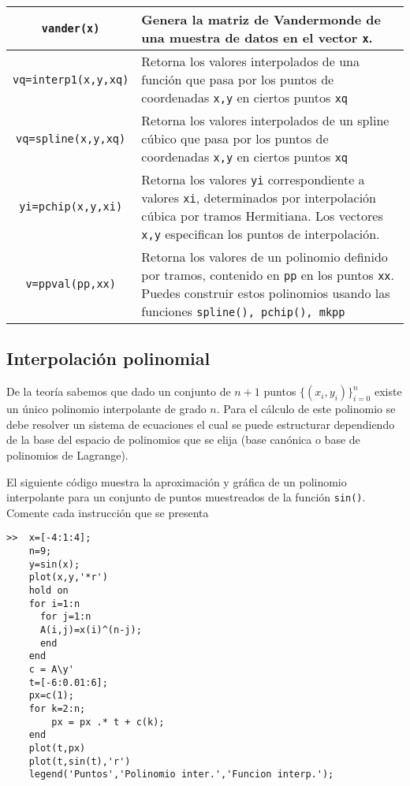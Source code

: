 \documentclass[12pt,letterpaper]{article}
\begin{document}
\begin{longtable}{||c|p{}||}
\hline
\texttt{vander(x)} 			& Genera la matriz de Vandermonde de una muestra de datos en el vector \texttt{x}. \\
\hline
\texttt{vq=interp1(x,y,xq)}	& Retorna los valores interpolados de una funci\'on que pasa por los puntos de coordenadas \texttt{x,y} en ciertos puntos \texttt{xq} \\
\hline
\texttt{vq=spline(x,y,xq)}	& Retorna los valores interpolados de un spline c\'ubico que pasa por los puntos de coordenadas \texttt{x,y} en ciertos puntos \texttt{xq} \\
\hline 
\texttt{yi=pchip(x,y,xi)}	& Retorna los valores \texttt{yi} correspondiente a valores \texttt{xi}, determinados por interpolaci\'on c\'ubica por tramos Hermitiana. Los vectores \texttt{x,y} especifican los puntos de interpolaci\'on. \\
\hline
\texttt{v=ppval(pp,xx)}		& Retorna los valores de un polinomio definido por tramos, contenido en \texttt{pp} en los puntos \texttt{xx}. Puedes construir estos polinomios usando las funciones \texttt{spline(), pchip(), mkpp} 
\\
\hline
\end{longtable}


\subsection{Interpolaci\'on polinomial}
De la teor\'ia sabemos que dado un conjunto de $n+1$ puntos $\{(x_i,y_i)\}_{i=0}^{n}$ existe un \'unico polinomio interpolante de grado $n$. Para el c\'alculo de este polinomio se debe resolver un sistema de ecuaciones el cual se puede estructurar dependiendo de la base del espacio de polinomios que se elija (base can\'onica o base de polinomios de Lagrange). 

El siguiente c\'odigo muestra la aproximaci\'on y gr\'afica de un polinomio interpolante para un conjunto de puntos muestreados de la funci\'on \texttt{sin()}. Comente cada instrucci\'on que se presenta 

\begin{verbatim}
>> 	x=[-4:1:4];
	n=9;
    y=sin(x); 
    plot(x,y,'*r') 
    hold on 
    for i=1:n 
      for j=1:n 
      A(i,j)=x(i)^(n-j);  
      end 
    end 
    c = A\y' 
    t=[-6:0.01:6]; 
    px=c(1); 
    for k=2:n; 
    	px = px .* t + c(k); 
    end 
    plot(t,px)
    plot(t,sin(t),'r')
    legend('Puntos','Polinomio inter.','Funcion interp.');
\end{verbatim}
\end{document}
